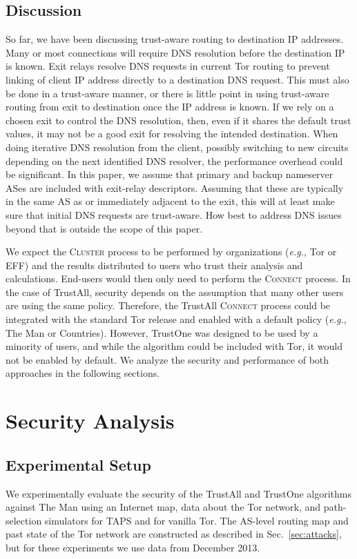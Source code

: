\documentclass[conference]{styles/IEEEtran}
\newcommand{\eg}{\emph{e.g.}}
\newcommand{\ps}{TAPS\xspace}
\begin{document}
\subsection{Discussion} \label{subsec:algorithm:disc}
So far, we have been discussing trust-aware routing to destination IP
addresses. Many or most connections will require DNS resolution before
the destination IP is known. Exit relays resolve DNS requests in
current Tor routing to prevent linking of client IP address directly
to a destination DNS request. This must also be done in a trust-aware
manner, or there is little point in using trust-aware routing from exit
to destination once the IP address is known. If we rely on a chosen
exit to control the DNS resolution, then, even if it shares the default
trust values, it may not be a good exit for resolving the intended
destination.  When doing iterative DNS resolution from the client, possibly
switching to new circuits depending on the next identified DNS
resolver, the performance overhead could be significant. In this paper,
we assume that primary and backup nameserver ASes are
included with exit-relay descriptors. Assuming that these are
typically in the same AS as or immediately adjacent to the exit, this
will at least make sure that initial DNS requests are trust-aware.
How best to address DNS issues beyond that is outside the scope of this
paper.


We expect the \textsc{Cluster} process to be performed by organizations (\eg{}, Tor or EFF) and the
results distributed to users who trust their analysis and calculations.
End-users would then only need to perform the \textsc{Connect} process.
In the case of TrustAll, security depends on the assumption that
many other users are using the same policy.
Therefore, the TrustAll \textsc{Connect} process could be integrated with the standard Tor release
and enabled with a default policy (\eg{}, \textsf{The Man} or \textsf{Countries}). However, TrustOne
was designed to be used by a minority of users, and while the algorithm could be included with Tor,
it would not be enabled by default. We analyze the security and
performance of both approaches in the following sections.

%
 \section{Security Analysis}\label{sec:sec}

\subsection{Experimental Setup}
We experimentally evaluate the security of the TrustAll and TrustOne algorithms against
\textsf{The Man} using an Internet map, data about the Tor network, and path-selection simulators
for \ps and for vanilla Tor. The AS-level routing map and past state of the Tor network are
constructed as described in Sec.~\ref{sec:attacks}, but for these experiments
we use data from December 2013.
\end{document}
